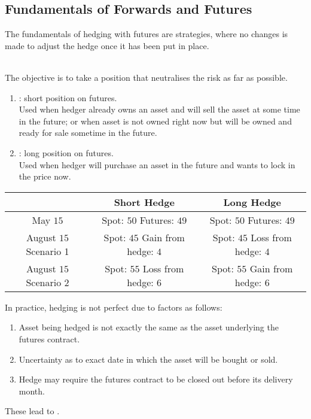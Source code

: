 \subsection{Fundamentals of Forwards and Futures}

The fundamentals of hedging with futures are  strategies, where no changes is made to adjust the hedge once it has been put in place.

\begin{definition}
\\
The objective is to take a position that neutralises the risk as far as possible.
\begin{enumerate}[label=\roman*.]
\setlength{\itemsep}{0pt}
\item {}: short position on futures. \\
Used when hedger already owns an asset and will sell the asset at some time in the future; or when asset is not owned right now but will be owned and ready for sale sometime in the future.
\item {}: long position on futures. \\
Used when hedger will purchase an asset in the future and wants to lock in the price now.
\end{enumerate}
\begin{table}[h]
\begin{tabular}{|c | c | c|}
\hline
 & \textbf{Short Hedge} & \textbf{Long Hedge} \\ \hline
May $15$ & \makecell[l]{Spot: $50$ \\ Futures: $49$} & \makecell[l]{Spot: $50$ \\ Futures: $49$} \\ \hline
August $15$ Scenario 1 & \makecell[l]{Spot: $45$ \\ Gain from hedge: $4$} &  \makecell[l]{Spot: $45$ \\ Loss from hedge: $4$} \\ \hline
August $15$ Scenario 2 & \makecell[l]{Spot: $55$ \\ Loss from hedge: $6$} & \makecell[l]{Spot: $55$ \\ Gain from hedge: $6$} \\ \hline
\end{tabular}
\end{table}
\end{definition}

In practice, hedging is not perfect due to factors as follows:
\begin{enumerate}[label=\arabic*.]
\setlength{\itemsep}{0pt}
\item Asset being hedged is not exactly the same as the asset underlying the futures contract.
\item Uncertainty as to exact date in which the asset will be bought or sold.
\item Hedge may require the futures contract to be closed out before its delivery month.
\end{enumerate}
These lead to .

